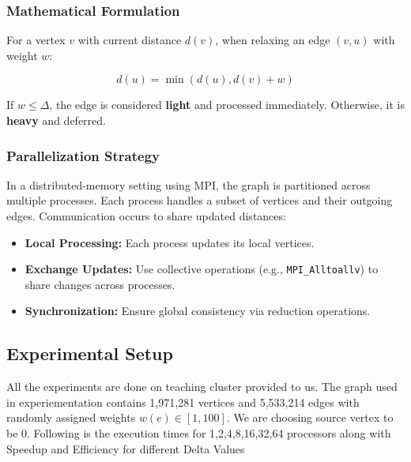 \documentclass{article}
\begin{document}
\subsubsection*{Mathematical Formulation}
For a vertex \( v \) with current distance \( d(v) \), when relaxing an edge \( (v, u) \) with weight \( w \):

\[
  d(u) = \min(d(u), d(v) + w)
\]

If \( w \leq \Delta \), the edge is considered \textbf{light} and processed immediately. Otherwise, it is \textbf{heavy} and deferred.

\subsubsection*{Parallelization Strategy}
In a distributed-memory setting using MPI, the graph is partitioned across multiple processes. Each process handles a subset of vertices and their outgoing edges. Communication occurs to share updated distances:

\begin{itemize}
    \item \textbf{Local Processing:} Each process updates its local vertices.
    \item \textbf{Exchange Updates:} Use collective operations (e.g., \texttt{MPI\_Alltoallv}) to share changes across processes.
    \item \textbf{Synchronization:} Ensure global consistency via reduction operations.
\end{itemize}

\subsection*{Experimental Setup}
All the experiments are done on teaching cluster provided to us. The graph used in experiementation contains 1,971,281 vertices and 5,533,214 edges with randomly assigned weights $w(e) \in [1, 100]$. We are choosing source vertex to be 0. Following is the execution times for 1,2,4,8,16,32,64 processors along with Speedup and Efficiency for different Delta Values
\end{document}
